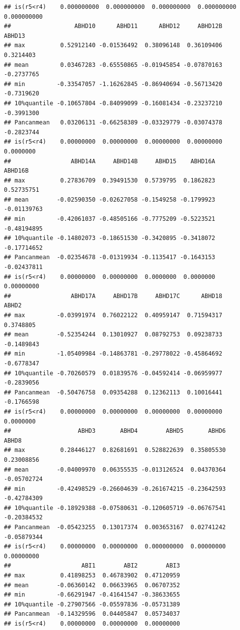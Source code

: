 \documentclass[
]{article}
\begin{document}
\begin{verbatim}
## is(r5<r4)    0.000000000  0.000000000  0.000000000  0.000000000  0.000000000
##                  ABHD10      ABHD11      ABHD12     ABHD12B     ABHD13
## max          0.52912140 -0.01536492  0.38096148  0.36109406  0.3214403
## mean         0.03467283 -0.65550865 -0.01945854 -0.07870163 -0.2737765
## min         -0.33547057 -1.16262845 -0.86940694 -0.56713420 -0.7319620
## 10%quantile -0.10657804 -0.84099099 -0.16081434 -0.23237210 -0.3991300
## Pancanmean   0.03206131 -0.66258389 -0.03329779 -0.03074378 -0.2823744
## is(r5<r4)    0.00000000  0.00000000  0.00000000  0.00000000  0.0000000
##                 ABHD14A     ABHD14B     ABHD15    ABHD16A     ABHD16B
## max          0.27836709  0.39491530  0.5739795  0.1862823  0.52735751
## mean        -0.02590350 -0.02627058 -0.1549258 -0.1799923 -0.01139763
## min         -0.42061037 -0.48505166 -0.7775209 -0.5223521 -0.48194895
## 10%quantile -0.14802073 -0.18651530 -0.3420895 -0.3418072 -0.17714652
## Pancanmean  -0.02354678 -0.01319934 -0.1135417 -0.1643153 -0.02437811
## is(r5<r4)    0.00000000  0.00000000  0.0000000  0.0000000  0.00000000
##                 ABHD17A     ABHD17B     ABHD17C      ABHD18      ABHD2
## max         -0.03991974  0.76022122  0.40959147  0.71594317  0.3748805
## mean        -0.52354244  0.13010927  0.08792753  0.09238733 -0.1489843
## min         -1.05409984 -0.14863781 -0.29778022 -0.45864692 -0.6778347
## 10%quantile -0.70260579  0.01839576 -0.04592414 -0.06959977 -0.2839056
## Pancanmean  -0.50476758  0.09354288  0.12362113  0.10016441 -0.1766598
## is(r5<r4)    0.00000000  0.00000000  0.00000000  0.00000000  0.0000000
##                   ABHD3       ABHD4        ABHD5       ABHD6       ABHD8
## max          0.28446127  0.82681691  0.528822639  0.35805530  0.23008856
## mean        -0.04009970  0.06355535 -0.013126524  0.04370364 -0.05702724
## min         -0.42498529 -0.26604639 -0.261674215 -0.23642593 -0.42784309
## 10%quantile -0.18929388 -0.07580631 -0.120605719 -0.06767541 -0.20384532
## Pancanmean  -0.05423255  0.13017374  0.003653167  0.02741242 -0.05879344
## is(r5<r4)    0.00000000  0.00000000  0.000000000  0.00000000  0.00000000
##                    ABI1        ABI2        ABI3
## max          0.41898253  0.46783902  0.47120959
## mean        -0.06360142  0.06633965  0.06707352
## min         -0.66291947 -0.41641547 -0.38633655
## 10%quantile -0.27907566 -0.05597836 -0.05731389
## Pancanmean  -0.14329596  0.04405847  0.05734037
## is(r5<r4)    0.00000000  0.00000000  0.00000000
\end{verbatim}
\end{document}
